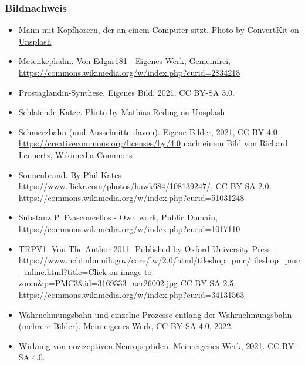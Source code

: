 \documentclass{beamer}
\begin{document}
\begin{frame}
 
\frametitle{Bildnachweis}
 
\begin{tiny}
  

\begin{itemize}

\item 
Mann mit Kopfhörern, der an einem Computer sitzt. Photo by \href{https://unsplash.com/@convertkit?utm_content=creditCopyText&utm_medium=referral&utm_source=unsplash}{  ConvertKit} on \href{https://unsplash.com/photos/BOI9jki3nzY?utm_content=creditCopyText&utm_medium=referral&utm_source=unsplash}{Unsplash}
  

\item
Metenkephalin. Von Edgar181 - Eigenes Werk, Gemeinfrei, \url{https://commons.wikimedia.org/w/index.php?curid=2834218}

\item
Prostaglandin-Synthese. Eigenes Bild, 2021. CC BY-SA 3.0.

\item
Schlafende Katze. Photo by \href{https://unsplash.com/@matreding?utm_source=unsplash&utm_medium=referral&utm_content=creditCopyText}{Mathias Reding} on \href{https://unsplash.com/s/photos/sleep?utm_source=unsplash&utm_medium=referral&utm_content=creditCopyText}{Unsplash}
  

\item
Schmerzbahn (und Ausschnitte davon). Eigene Bilder, 2021, CC BY 4.0 \url{https://creativecommons.org/licenses/by/4.0} nach einem Bild von Richard Lennertz,  Wikimedia Commons

\item
Sonnenbrand. By Phil Kates - \url{https://www.flickr.com/photos/hawk684/108139247/}, CC BY-SA 2.0, \url{https://commons.wikimedia.org/w/index.php?curid=51031248}

\item
Substanz P. Fvasconcellos - Own work, Public Domain, \url{https://commons.wikimedia.org/w/index.php?curid=1017110}

\item
TRPV1. Von The Author 2011. Published by Oxford University Press - \url{https://www.ncbi.nlm.nih.gov/core/lw/2.0/html/tileshop_pmc/tileshop_pmc_inline.html?title=Click on image to zoom&p=PMC3&id=3169333_aer26002.jpg}
CC BY-SA 2.5, \url{https://commons.wikimedia.org/w/index.php?curid=34131563}

\item
Wahrnehmungsbahn und einzelne Prozesse entlang der Wahrnehmungsbahn (mehrere Bilder). Mein eigenes Werk, CC BY-SA 4.0, 2022. 

\item
Wirkung von nozizeptiven Neuropeptiden. Mein eigenes Werk, 2021. CC BY-SA 4.0. 

\end{itemize}
\end{tiny}

\end{frame}
\end{document}
